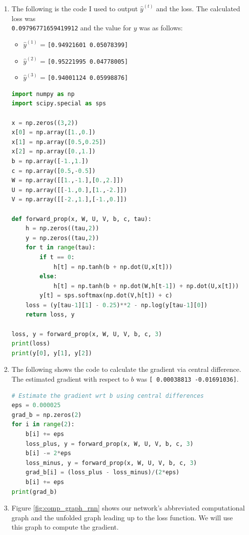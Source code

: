 \documentclass[
	12pt, %
]{../Template/fphw}
\begin{document}
\begin{enumerate}[label=(\arabic*)]
    \item  The following is the code I used to output $\hat{y}^{(t)}$ and the loss. The calculated loss was \\ \verb|0.09796771659419912| and the value for $y$ was as follows:
    \begin{itemize}
        \item $\hat{y}^{(1)}$ = \verb|[0.94921601 0.05078399]|
        \item $\hat{y}^{(2)}$ = \verb|[0.95221995 0.04778005]|
        \item $\hat{y}^{(3)}$ = \verb|[0.94001124 0.05998876]|
    \end{itemize}
    \begin{lstlisting}[language=Python]
import numpy as np
import scipy.special as sps

x = np.zeros((3,2))
x[0] = np.array([1.,0.])
x[1] = np.array([0.5,0.25])
x[2] = np.array([0.,1.])
b = np.array([-1.,1.])
c = np.array([0.5,-0.5])
W = np.array([[1.,-1.],[0.,2.]])
U = np.array([[-1.,0.],[1.,-2.]])
V = np.array([[-2.,1.],[-1.,0.]])

def forward_prop(x, W, U, V, b, c, tau):
    h = np.zeros((tau,2))
    y = np.zeros((tau,2))
    for t in range(tau):
        if t == 0:
            h[t] = np.tanh(b + np.dot(U,x[t]))
        else:
            h[t] = np.tanh(b + np.dot(W,h[t-1]) + np.dot(U,x[t]))
        y[t] = sps.softmax(np.dot(V,h[t]) + c)
    loss = (y[tau-1][1] - 0.25)**2 - np.log(y[tau-1][0])
    return loss, y

loss, y = forward_prop(x, W, U, V, b, c, 3)
print(loss)
print(y[0], y[1], y[2])
    \end{lstlisting}
    \item The following shows the code to calculate the gradient via central difference. The estimated gradient with respect to $b$ was \verb|[ 0.00038813 -0.01691036]|.
    \begin{lstlisting}[language=Python]
# Estimate the gradient wrt b using central differences
eps = 0.000025
grad_b = np.zeros(2)
for i in range(2):
    b[i] += eps
    loss_plus, y = forward_prop(x, W, U, V, b, c, 3)
    b[i] -= 2*eps
    loss_minus, y = forward_prop(x, W, U, V, b, c, 3)
    grad_b[i] = (loss_plus - loss_minus)/(2*eps)
    b[i] += eps
print(grad_b)
    \end{lstlisting}
    \item Figure \ref{fig:comp_graph_rnn} shows our network's abbreviated computational graph and the unfolded graph leading up to the loss function. We will use this graph to compute the gradient.
    \begin{figure}[!htbp]
        \centering
{} %


\end{figure}
\end{enumerate}
\end{document}
